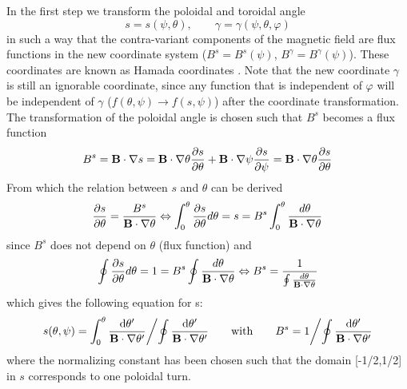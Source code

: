 In the first step we transform the poloidal and toroidal angle 
\begin{equation} 
s = s(\psi,\theta), \qquad \gamma = \gamma(\psi,\theta,\varphi)
\end{equation} 
in such a way that the contra-variant components of the magnetic field are flux functions 
in the new coordinate system ($B^s = B^s(\psi)$, $B^\gamma = B^\gamma(\psi)$). These 
coordinates are known as Hamada coordinates \cite{HAM62}.
Note that the new coordinate $\gamma$ is still an ignorable coordinate, since any function that is independent of $\varphi$
will be independent of $\gamma$ ($f(\theta,\psi) \rightarrow f(s,\psi)$) after the coordinate 
transformation. The transformation of the poloidal angle is chosen such that $B^s$ becomes 
a flux function 
\begin{equation} 
B^s = {\bf B} \cdot \nabla s = {\bf B}\cdot \nabla \theta {\partial s \over \partial \theta} 
+ {\bf B} \cdot \nabla \psi {\partial s \over \partial \psi} = {\bf B} \cdot \nabla \theta 
{\partial s \over \partial \theta}
\end{equation} 
From which the relation between $s$ and $\theta$ can be derived 
\begin{equation}
{\partial s \over \partial \theta}={B^{s} \over {\bf B \cdot \nabla \theta}}\Leftrightarrow
\int_{0}^{\theta}{\partial s \over \partial \theta}d\theta =s=B^{s}\int_{0}^{\theta}{d\theta \over 
{\bf B}\cdot \nabla \theta}
\end{equation}
since $B^{s}$ does not depend on $\theta$ (flux function) and
\begin{equation}
\oint {\partial s \over \partial \theta}d\theta =1=B^{s}\oint {d\theta \over {\bf B}\cdot \nabla 
\theta}\Leftrightarrow B^{s}={1 \over \oint {d\theta \over {\bf B}\cdot \nabla \theta} }
\end{equation}
which gives the following equation for s:
\begin{equation} 
s(\theta,\psi) = {\int_0^\theta {{\rm d} \theta^\prime \over {\bf B} \cdot \nabla \theta^\prime} 
\biggl /  \oint {{\rm d}\theta^\prime \over {\bf B}\cdot \nabla \theta^\prime}} \qquad 
{\rm with} \qquad 
B^s =  {1
\biggl /  \oint {{\rm d}\theta^\prime \over {\bf B}\cdot \nabla \theta^\prime}}
\end{equation}  
where the normalizing constant has been chosen such that the domain [-1/2,1/2] in $s$ corresponds 
to one poloidal turn. 

